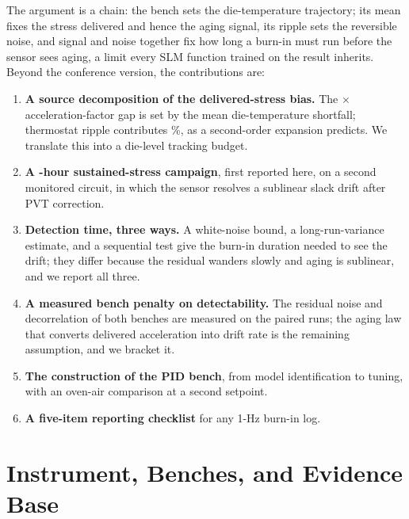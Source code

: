 \documentclass[10pt,twocolumn]{article}
\begin{document}
The argument is a chain: the bench sets the die-temperature trajectory; its mean fixes the stress delivered and hence the aging signal, its ripple sets the reversible noise, and signal and noise together fix how long a burn-in must run before the sensor sees aging, a limit every SLM function trained on the result inherits. Beyond the conference version, the contributions are:
\begin{enumerate}\setlength{\itemsep}{1pt}\setlength{\parsep}{0pt}
\item \textbf{A source decomposition of the delivered-stress bias.} The \vAFratio$\times$ acceleration-factor gap is set by the mean die-temperature shortfall; thermostat ripple contributes \vRippleBB\%, as a second-order expansion predicts. We translate this into a die-level tracking budget.
\item \textbf{A \vDurRCA-hour sustained-stress campaign}, first reported here, on a second monitored circuit, in which the sensor resolves a sublinear slack drift after PVT correction.
\item \textbf{Detection time, three ways.} A white-noise bound, a long-run-variance estimate, and a sequential test give the burn-in duration needed to see the drift; they differ because the residual wanders slowly and aging is sublinear, and we report all three.
\item \textbf{A measured bench penalty on detectability.} The residual noise and decorrelation of both benches are measured on the paired runs; the aging law that converts delivered acceleration into drift rate is the remaining assumption, and we bracket it.
\item \textbf{The construction of the PID bench}, from model identification to tuning, with an oven-air comparison at a second setpoint.
\item \textbf{A five-item reporting checklist} for any 1-Hz burn-in log.
\end{enumerate}



\section{Instrument, Benches, and Evidence Base}
\end{document}
